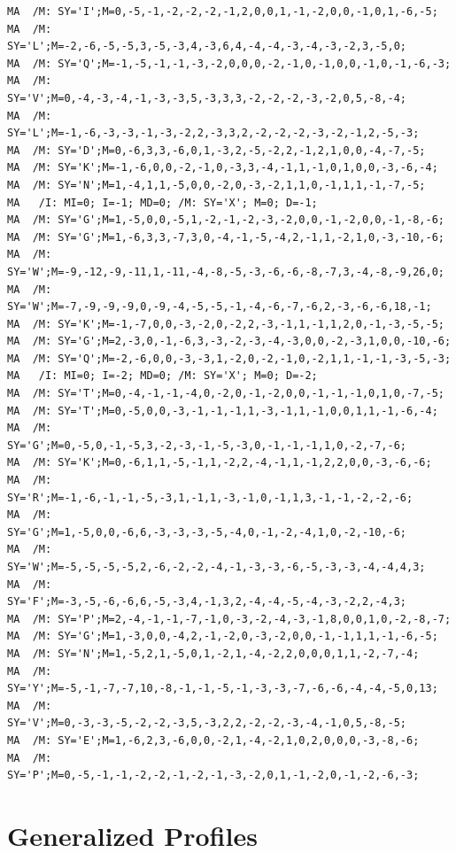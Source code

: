 \documentclass[a4paper,10pt,twoside]{scrartcl}
\begin{document}
\begin{verbatim}
MA  /M: SY='I';M=0,-5,-1,-2,-2,-2,-1,2,0,0,1,-1,-2,0,0,-1,0,1,-6,-5;
MA  /M: SY='L';M=-2,-6,-5,-5,3,-5,-3,4,-3,6,4,-4,-4,-3,-4,-3,-2,3,-5,0;
MA  /M: SY='Q';M=-1,-5,-1,-1,-3,-2,0,0,0,-2,-1,0,-1,0,0,-1,0,-1,-6,-3;
MA  /M: SY='V';M=0,-4,-3,-4,-1,-3,-3,5,-3,3,3,-2,-2,-2,-3,-2,0,5,-8,-4;
MA  /M: SY='L';M=-1,-6,-3,-3,-1,-3,-2,2,-3,3,2,-2,-2,-2,-3,-2,-1,2,-5,-3;
MA  /M: SY='D';M=0,-6,3,3,-6,0,1,-3,2,-5,-2,2,-1,2,1,0,0,-4,-7,-5;
MA  /M: SY='K';M=-1,-6,0,0,-2,-1,0,-3,3,-4,-1,1,-1,0,1,0,0,-3,-6,-4;
MA  /M: SY='N';M=1,-4,1,1,-5,0,0,-2,0,-3,-2,1,1,0,-1,1,1,-1,-7,-5;
MA   /I: MI=0; I=-1; MD=0; /M: SY='X'; M=0; D=-1;
MA  /M: SY='G';M=1,-5,0,0,-5,1,-2,-1,-2,-3,-2,0,0,-1,-2,0,0,-1,-8,-6;
MA  /M: SY='G';M=1,-6,3,3,-7,3,0,-4,-1,-5,-4,2,-1,1,-2,1,0,-3,-10,-6;
MA  /M: SY='W';M=-9,-12,-9,-11,1,-11,-4,-8,-5,-3,-6,-6,-8,-7,3,-4,-8,-9,26,0;
MA  /M: SY='W';M=-7,-9,-9,-9,0,-9,-4,-5,-5,-1,-4,-6,-7,-6,2,-3,-6,-6,18,-1;
MA  /M: SY='K';M=-1,-7,0,0,-3,-2,0,-2,2,-3,-1,1,-1,1,2,0,-1,-3,-5,-5;
MA  /M: SY='G';M=2,-3,0,-1,-6,3,-3,-2,-3,-4,-3,0,0,-2,-3,1,0,0,-10,-6;
MA  /M: SY='Q';M=-2,-6,0,0,-3,-3,1,-2,0,-2,-1,0,-2,1,1,-1,-1,-3,-5,-3;
MA   /I: MI=0; I=-2; MD=0; /M: SY='X'; M=0; D=-2;
MA  /M: SY='T';M=0,-4,-1,-1,-4,0,-2,0,-1,-2,0,0,-1,-1,-1,0,1,0,-7,-5;
MA  /M: SY='T';M=0,-5,0,0,-3,-1,-1,-1,1,-3,-1,1,-1,0,0,1,1,-1,-6,-4;
MA  /M: SY='G';M=0,-5,0,-1,-5,3,-2,-3,-1,-5,-3,0,-1,-1,-1,1,0,-2,-7,-6;
MA  /M: SY='K';M=0,-6,1,1,-5,-1,1,-2,2,-4,-1,1,-1,2,2,0,0,-3,-6,-6;
MA  /M: SY='R';M=-1,-6,-1,-1,-5,-3,1,-1,1,-3,-1,0,-1,1,3,-1,-1,-2,-2,-6;
MA  /M: SY='G';M=1,-5,0,0,-6,6,-3,-3,-3,-5,-4,0,-1,-2,-4,1,0,-2,-10,-6;
MA  /M: SY='W';M=-5,-5,-5,-5,2,-6,-2,-2,-4,-1,-3,-3,-6,-5,-3,-3,-4,-4,4,3;
MA  /M: SY='F';M=-3,-5,-6,-6,6,-5,-3,4,-1,3,2,-4,-4,-5,-4,-3,-2,2,-4,3;
MA  /M: SY='P';M=2,-4,-1,-1,-7,-1,0,-3,-2,-4,-3,-1,8,0,0,1,0,-2,-8,-7;
MA  /M: SY='G';M=1,-3,0,0,-4,2,-1,-2,0,-3,-2,0,0,-1,-1,1,1,-1,-6,-5;
MA  /M: SY='N';M=1,-5,2,1,-5,0,1,-2,1,-4,-2,2,0,0,0,1,1,-2,-7,-4;
MA  /M: SY='Y';M=-5,-1,-7,-7,10,-8,-1,-1,-5,-1,-3,-3,-7,-6,-6,-4,-4,-5,0,13;
MA  /M: SY='V';M=0,-3,-3,-5,-2,-2,-3,5,-3,2,2,-2,-2,-3,-4,-1,0,5,-8,-5;
MA  /M: SY='E';M=1,-6,2,3,-6,0,0,-2,1,-4,-2,1,0,2,0,0,0,-3,-8,-6;
MA  /M: SY='P';M=0,-5,-1,-1,-2,-2,-1,-2,-1,-3,-2,0,1,-1,-2,0,-1,-2,-6,-3;
\end{verbatim}

\renewcommand{\overrightarrow}{\boldsymbol}

\section{Generalized Profiles}
\end{document}

